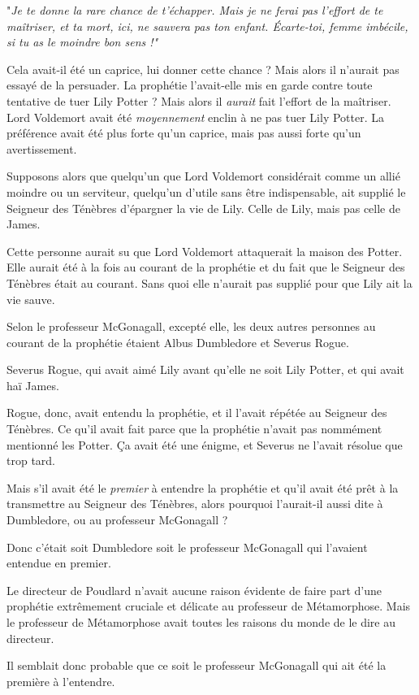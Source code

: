 "\emph{Je te donne la rare chance de t'échapper. Mais je ne ferai pas l'effort de te maîtriser, et ta mort, ici, ne sauvera pas ton enfant. Écarte-toi, femme imbécile, si tu as le moindre bon sens !"} 

Cela avait-il été un caprice, lui donner cette chance ? Mais alors il n'aurait pas essayé de la persuader. La prophétie l'avait-elle mis en garde contre toute tentative de tuer Lily Potter ? Mais alors il \emph{aurait}  fait l'effort de la maîtriser. Lord Voldemort avait été \emph{moyennement}  enclin à ne pas tuer Lily Potter. La préférence avait été plus forte qu'un caprice, mais pas aussi forte qu'un avertissement.

Supposons alors que quelqu'un que Lord Voldemort considérait comme un allié moindre ou un serviteur, quelqu'un d'utile sans être indispensable, ait supplié le Seigneur des Ténèbres d'épargner la vie de Lily. Celle de Lily, mais pas celle de James.

Cette personne aurait su que Lord Voldemort attaquerait la maison des Potter. Elle aurait été à la fois au courant de la prophétie et du fait que le Seigneur des Ténèbres était au courant. Sans quoi elle n'aurait pas supplié pour que Lily ait la vie sauve.

Selon le professeur McGonagall, excepté elle, les deux autres personnes au courant de la prophétie étaient Albus Dumbledore et Severus Rogue.

Severus Rogue, qui avait aimé Lily avant qu'elle ne soit Lily Potter, et qui avait haï James.

Rogue, donc, avait entendu la prophétie, et il l'avait répétée au Seigneur des Ténèbres. Ce qu'il avait fait parce que la prophétie n'avait pas nommément mentionné les Potter. Ça avait été une énigme, et Severus ne l'avait résolue que trop tard.

Mais s'il avait été le \emph{premier}  à entendre la prophétie et qu'il avait été prêt à la transmettre au Seigneur des Ténèbres, alors pourquoi l'aurait-il aussi dite à Dumbledore, ou au professeur McGonagall ?

Donc c'était soit Dumbledore soit le professeur McGonagall qui l'avaient entendue en premier.

Le directeur de Poudlard n'avait aucune raison évidente de faire part d'une prophétie extrêmement cruciale et délicate au professeur de Métamorphose. Mais le professeur de Métamorphose avait toutes les raisons du monde de le dire au directeur.

Il semblait donc probable que ce soit le professeur McGonagall qui ait été la première à l'entendre.

